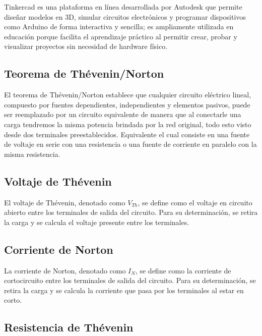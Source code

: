 \documentclass{article}
\begin{document}

    Tinkercad es una plataforma en línea desarrollada por Autodesk que permite diseñar modelos en 3D, simular circuitos electrónicos y programar dispositivos como Arduino de forma interactiva y sencilla; es ampliamente utilizada en educación porque facilita el aprendizaje práctico al permitir crear, probar y visualizar proyectos sin necesidad de hardware físico.

    \subsection{Teorema de Thévenin/Norton}

    El teorema de Thévenin/Norton establece que cualquier circuito eléctrico lineal, compuesto por fuentes dependientes, independientes y elementos pasivos, puede ser reemplazado por un circuito equivalente de manera que al conectarle una carga tendremos la misma potencia brindada por la red original, todo esto visto desde dos terminales preestablecidos. Equivalente el cual consiste en una fuente de voltaje en serie con una resistencia o una fuente de corriente en paralelo con la misma resistencia.


    \subsection{Voltaje de Thévenin}

    El voltaje de Thévenin, denotado como $V_{Th}$, se define como el voltaje en circuito abierto entre los terminales de salida del circuito. Para su determinación, se retira la carga y se calcula el voltaje presente entre los terminales.

    \subsection{Corriente de Norton}

    La corriente de Norton, denotado como $I_N$, se define como la corriente de cortocircuito entre los terminales de salida del circuito. Para su determinación, se retira la carga y se calcula la corriente que pasa por los terminales al estar en corto.

    \subsection{Resistencia de Thévenin}
\end{document}
